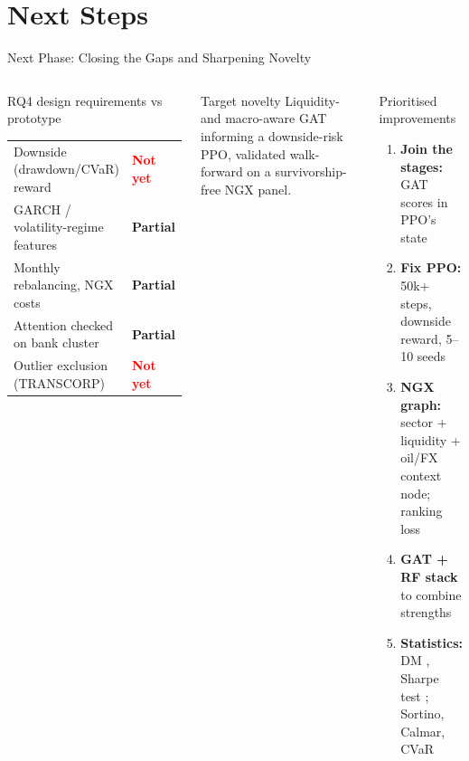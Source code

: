 \documentclass[aspectratio=169,11pt]{beamer}
\begin{document}
	\section{Next Steps}

	\begin{frame}{Next Phase: Closing the Gaps and Sharpening Novelty}
		\vspace{-14pt}
		\begin{columns}[T]
			\begin{block}{RQ4 design requirements vs prototype}
				{\scriptsize\renewcommand{\arraystretch}{0.95}
				\begin{tabular}{@{}L{4.6cm}l@{}}
					Downside (drawdown/CVaR) reward & \textcolor{Red}{\textbf{Not yet}}\\
					GARCH / volatility-regime features & \textcolor{Gold!80!black}{\textbf{Partial}}\\
					Monthly rebalancing, NGX costs & \textcolor{Gold!80!black}{\textbf{Partial}}\\
					Attention checked on bank cluster & \textcolor{Gold!80!black}{\textbf{Partial}}\\
					Outlier exclusion (TRANSCORP) & \textcolor{Red}{\textbf{Not yet}}\\
				\end{tabular}}
			\end{block}
			\begin{exampleblock}{Target novelty}
				\scriptsize Liquidity- and macro-aware GAT informing a downside-risk PPO, validated walk-forward on a survivorship-free NGX panel.
			\end{exampleblock}
			\begin{block}{Prioritised improvements}
				\scriptsize
				\begin{enumerate}\setlength\itemsep{1pt}
					\item \textbf{Join the stages:} GAT scores in PPO's state \citep{huang2024}
					\item \textbf{Fix PPO:} 50k+ steps, downside reward, 5--10 seeds
					\item \textbf{NGX graph:} sector + liquidity + oil/FX context node; ranking loss
					\item \textbf{GAT + RF stack} to combine strengths
					\item \textbf{Statistics:} DM \citep{diebold1995comparing}, Sharpe test \citep{ledoit2008robust}; Sortino, Calmar, CVaR

\end{enumerate}
\end{block}
\end{columns}
\end{frame}
\end{document}
